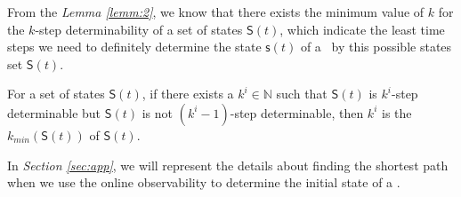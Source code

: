 From the {\em Lemma \ref{lemm:2}}, we know that there exists the minimum value of $k$ for the $k$-step determinability of a set of states $\mathsf{S}(t)$, which indicate the least time steps we need to definitely determine the state $\mathsf{s}(t)$ of a \BCN\ by this possible states set $\mathsf{S}(t)$.
\begin{definition} 
For a set of states $\mathsf{S}(t)$, if there exists a $k^i\in \mathbb{N}$ such that $\mathsf{S}(t)$ is $k^i$-step determinable but $\mathsf{S}(t)$ is not $(k^{i}-1)$-step determinable, then $k^{i}$ is the $k_{min}(\mathsf{S}(t))$ of $\mathsf{S}(t)$.
\end{definition}

In {\em Section \ref{sec:app}}, we will represent the details about finding the shortest path when we use the online observability to determine the initial state of a \BCN. %



